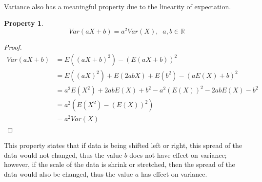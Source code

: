 \documentclass{article}
\newtheorem{property}{Property}
\begin{document}
Variance also has a meaningful property due to the linearity of expectation.
\begin{property}
	\[ Var(aX+b) = a^2Var(X),\;\;a,b\in\mathbb{R} \]
\end{property}
\begin{proof}
	\begin{align*}
	Var(aX+b) &=  E((aX+b)^2) - (E(aX+b))^2\\
	&= E((aX)^2) + E(2abX) + E(b^2) - (aE(X)+b)^2\\
	&= a^2E(X^2) + 2abE(X) + b^2 - a^2(E(X))^2 - 2abE(X) -b^2\\
	&= a^2(E(X^2) - (E(X))^2)\\
	&= a^2Var(X)
	\end{align*}	
\end{proof}
This property states that if data is being shifted left or right, this spread of the data would not changed, thus the value $b$ does not have effect on variance; however, if the scale of the data is shrink or stretched, then the spread of the data would also be changed, thus the value $a$ has effect on variance. 
\end{document}
